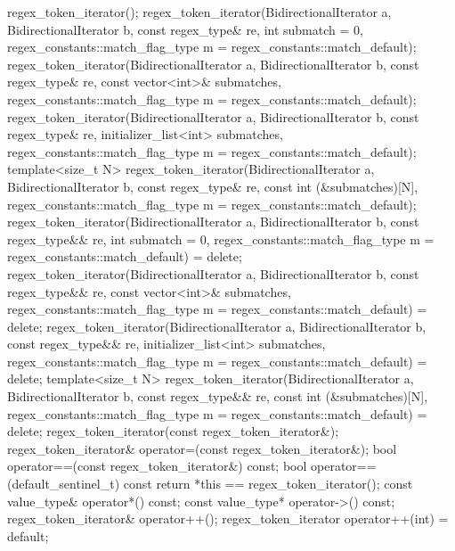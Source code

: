 \begin{codeblock}
{{    regex_token_iterator();
    regex_token_iterator(BidirectionalIterator a, BidirectionalIterator b,
                         const regex_type& re,
                         int submatch = 0,
                         regex_constants::match_flag_type m =
                           regex_constants::match_default);
    regex_token_iterator(BidirectionalIterator a, BidirectionalIterator b,
                         const regex_type& re,
                         const vector<int>& submatches,
                         regex_constants::match_flag_type m =
                           regex_constants::match_default);
    regex_token_iterator(BidirectionalIterator a, BidirectionalIterator b,
                         const regex_type& re,
                         initializer_list<int> submatches,
                         regex_constants::match_flag_type m =
                           regex_constants::match_default);
    template<size_t N>
      regex_token_iterator(BidirectionalIterator a, BidirectionalIterator b,
                           const regex_type& re,
                           const int (&submatches)[N],
                           regex_constants::match_flag_type m =
                             regex_constants::match_default);
    regex_token_iterator(BidirectionalIterator a, BidirectionalIterator b,
                         const regex_type&& re,
                         int submatch = 0,
                         regex_constants::match_flag_type m =
                           regex_constants::match_default) = delete;
    regex_token_iterator(BidirectionalIterator a, BidirectionalIterator b,
                         const regex_type&& re,
                         const vector<int>& submatches,
                         regex_constants::match_flag_type m =
                           regex_constants::match_default) = delete;
    regex_token_iterator(BidirectionalIterator a, BidirectionalIterator b,
                         const regex_type&& re,
                         initializer_list<int> submatches,
                         regex_constants::match_flag_type m =
                           regex_constants::match_default) = delete;
    template<size_t N>
      regex_token_iterator(BidirectionalIterator a, BidirectionalIterator b,
                           const regex_type&& re,
                           const int (&submatches)[N],
                           regex_constants::match_flag_type m =
                             regex_constants::match_default) = delete;
    regex_token_iterator(const regex_token_iterator&);
    regex_token_iterator& operator=(const regex_token_iterator&);
    bool operator==(const regex_token_iterator&) const;
    bool operator==(default_sentinel_t) const { return *this == regex_token_iterator(); }
    const value_type& operator*() const;
    const value_type* operator->() const;
    regex_token_iterator& operator++();
    regex_token_iterator operator++(int) = default;

}}
\end{codeblock}
